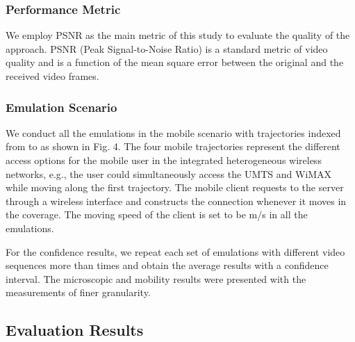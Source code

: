 \documentclass[journal]{IEEEtran}
\begin{document}
\subsubsection{Performance Metric}
We employ PSNR as the main metric of this study to evaluate the quality of the approach. PSNR (Peak Signal-to-Noise Ratio) is a standard metric of video quality and is a function of the mean square error between the original and the received video frames.

\subsubsection{Emulation Scenario}
We conduct all the emulations in the mobile scenario with trajectories indexed from  to  as shown in Fig. 4. The four mobile trajectories represent the different access options for the mobile user in the integrated heterogeneous wireless networks, e.g., the user could simultaneously access the UMTS and WiMAX while moving along the first trajectory. The mobile client requests to the server through a wireless interface and constructs the connection whenever it moves in the coverage. The moving speed of the client is set to be  m/s in all the emulations.

For the confidence results, we repeat each set of emulations with different video sequences more than  times and obtain the average results with a  confidence interval. The microscopic and mobility results were presented with the measurements of finer granularity.
\subsection{Evaluation Results}
\end{document}
